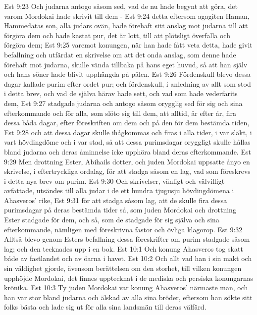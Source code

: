 Est 9:23  Och judarna antogo såsom sed, vad de nu hade begynt att göra, det varom Mordokai hade skrivit till dem -
Est 9:24  detta eftersom agagiten Haman, Hammedatas son, alla judars ovän, hade förehaft sitt anslag mot judarna till att förgöra dem och hade kastat pur, det är lott, till att plötsligt överfalla och förgöra dem;
Est 9:25  varemot konungen, när han hade fått veta detta, hade givit befallning och utfärdat en skrivelse om att det onda anslag, som denne hade förehaft mot judarna, skulle vända tillbaka på hans eget huvud, så att han själv och hans söner hade blivit upphängda på pålen.
Est 9:26  Fördenskull blevo dessa dagar kallade purim efter ordet pur; och fördenskull, i anledning av allt som stod i detta brev, och vad de själva härav hade sett, och vad som hade vederfarits dem,
Est 9:27  stadgade judarna och antogo såsom orygglig sed för sig och sina efterkommande och för alla, som slöto sig till dem, att alltid, år efter år, fira dessa båda dagar, efter föreskriften om dem och på den för dem bestämda tiden,
Est 9:28  och att dessa dagar skulle ihågkommas och firas i alla tider, i var släkt, i vart hövdingdöme och i var stad, så att dessa purimsdagar oryggligt skulle hållas bland judarna och deras åminnelse icke upphöra bland deras efterkommande.
Est 9:29  Men drottning Ester, Abihails dotter, och juden Mordokai uppsatte ånyo en skrivelse, i eftertryckliga ordalag, för att stadga såsom en lag, vad som föreskrevs i detta nya brev om purim.
Est 9:30  Och skrivelser, vänligt och välvilligt avfattade, utsändes till alla judar i de ett hundra tjugusju hövdingdömena i Ahasveros' rike,
Est 9:31  för att stadga såsom lag, att de skulle fira dessa purimsdagar på deras bestämda tider så, som juden Mordokai och drottning Ester stadgade för dem, och så, som de stadgade för sig själva och sina efterkommande, nämligen med föreskrivna fastor och övliga klagorop.
Est 9:32  Alltså blevo genom Esters befallning dessa föreskrifter om purim stadgade såsom lag; och den tecknades upp i en bok.
Est 10:1  Och konung Ahasveros tog skatt både av fastlandet och av öarna i havet.
Est 10:2  Och allt vad han i sin makt och sin väldighet gjorde, ävensom berättelsen om den storhet, till vilken konungen upphöjde Mordokai, det finnes upptecknat i de mediska och persiska konungarnas krönika.
Est 10:3  Ty juden Mordokai var konung Ahasveros' närmaste man, och han var stor bland judarna och älskad av alla sina bröder, eftersom han sökte sitt folks bästa och lade sig ut för alla sina landsmän till deras välfärd.


